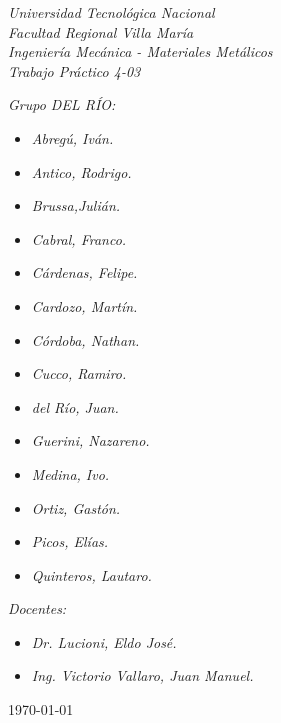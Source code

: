 \begin{titlepage}
	
	\begin{center}
		{\huge \textit{Universidad Tecnológica Nacional}}\\
        \vspace{0.5cm}
		{\LARGE \textit{Facultad Regional Villa María}}\\
		\vspace{1.5cm}
        {\LARGE{\textit{Ingeniería Mecánica - Materiales Metálicos}}}\\
		\vspace{1.5cm}
        \LARGE{\textit{Trabajo Práctico 4-03}}
	\end{center}
	
	\vfill

    \textit{Grupo DEL RÍO:}
	\begin{itemize}
		\item \textit{Abregú, Iván.}
		\item \textit{Antico, Rodrigo.}
		\item \textit{Brussa,Julián.}
		\item \textit{Cabral, Franco.}
        \item \textit{Cárdenas, Felipe.}
        \item \textit{Cardozo, Martín.}
        \item \textit{Córdoba, Nathan.}
        \item \textit{Cucco, Ramiro.}
        \item \textit{del Río, Juan.}
        \item \textit{Guerini, Nazareno.}
        \item \textit{Medina, Ivo.}
        \item \textit{Ortiz, Gastón.}
        \item \textit{Picos, Elías.}
        \item \textit{Quinteros, Lautaro.}
	\end{itemize}
    
	\textit{Docentes:}
	\begin{itemize}
		\item \textit{Dr. Lucioni, Eldo José.}
		\item \textit{Ing. Victorio Vallaro, Juan Manuel.}
	\end{itemize}
	\centering
	\today
	
\end{titlepage}
